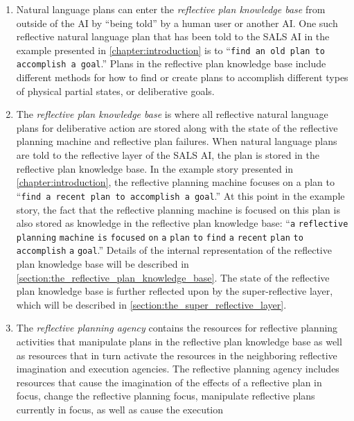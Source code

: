 \begin{enumerate}[~~A.]
\item Natural language plans can enter the {\emph{reflective plan
    knowledge base}} from outside of the AI by ``being told'' by a
  human user or another AI.  One such reflective natural language plan
  that has been told to the SALS AI in the example presented in
  {\mbox{\autoref{chapter:introduction}}} is to ``{\tt{find an old
      plan to accomplish a goal}}.''  Plans in the reflective plan
  knowledge base include different methods for how to find or create
  plans to accomplish different types of physical partial states, or
  deliberative goals.
\item The {\emph{reflective plan knowledge base}} is where all
  reflective natural language plans for deliberative action are stored
  along with the state of the reflective planning machine and
  reflective plan failures.  When natural language plans are told to
  the reflective layer of the SALS AI, the plan is stored in the
  reflective plan knowledge base.  In the example story presented in
  {\mbox{\autoref{chapter:introduction}}}, the reflective planning
  machine focuses on a plan to ``{\tt{find a recent plan to accomplish
      a goal}}.''  At this point in the example story, the fact that
  the reflective planning machine is focused on this plan is also
  stored as knowledge in the reflective plan knowledge base:
  ``{\tt{a}} {\tt{reflective}} {\tt{planning}} {\tt{machine}}
  {\tt{is}} {\tt{focused}} {\tt{on}} {\tt{a}} {\tt{plan}} {\tt{to}}
  {\tt{find}} {\tt{a}} {\tt{recent}} {\tt{plan}} {\tt{to}}
  {\tt{accomplish}} {\tt{a}} {\tt{goal}}.''  Details of the internal
  representation of the reflective plan knowledge base will be
  described in
  {\mbox{\autoref{section:the_reflective_plan_knowledge_base}}}.  The
  state of the reflective plan knowledge base is further reflected
  upon by the super-reflective layer, which will be described in
  {\mbox{\autoref{section:the_super_reflective_layer}}}.
\item The {\emph{reflective planning agency}} contains the resources
  for reflective planning activities that manipulate plans in the
  reflective plan knowledge base as well as resources that in turn
  activate the resources in the neighboring reflective imagination and
  execution agencies.  The reflective planning agency includes
  resources that cause the imagination of the effects of a reflective
  plan in focus, change the reflective planning focus, manipulate
  reflective plans currently in focus, as well as cause the execution

\end{enumerate}
